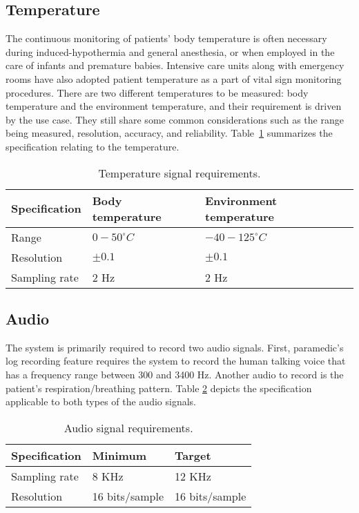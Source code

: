 \subsection{Temperature}

The continuous monitoring of patients' body temperature is often
necessary during induced-hypothermia and general anesthesia, or when
employed in the care of infants and premature babies. Intensive care
units along with emergency rooms have also adopted patient
temperature as a part of vital sign monitoring procedures. There are
two different temperatures to be measured: body temperature and the
environment temperature, and their requirement is driven by the use
case. They still share some common considerations such as the range
being measured, resolution, accuracy, and reliability.
Table~\ref{table:tmp} summarizes the specification relating to the
temperature. 

\begin{table}
	\caption{Temperature signal requirements.}
	\label{table:tmp}
	\centering
	\begin{tabular}{|l|l|l|}
		\hline
		Specification & Body temperature & Environment temperature \\
		\hline
		Range & $0-50 ^{\circ}C$ & $-40-125 ^{\circ}C$ \\
		Resolution & $\pm 0.1$ & $\pm 0.1$\\
		Sampling rate & 2 Hz & 2 Hz \\
		\hline
	\end{tabular}
\end{table}

\subsection{Audio}

The system is primarily required to record two audio signals. First,
paramedic's log recording feature requires the system to record the
human talking voice that has a frequency range between 300 and 3400
Hz.  Another audio to record is the patient's respiration/breathing
pattern. Table \ref{table:aud} depicts the specification applicable
to both types of the audio signals. 

\begin{table}
	\caption{Audio signal requirements.}
	\label{table:aud}
	\centering
	\begin{tabular}{|l|l|l|}
		\hline
		Specification & Minimum & Target \\
		\hline
		Sampling rate &  8 KHz & 12 KHz \\
		Resolution & 16 bits/sample & 16 bits/sample \\
		\hline
	\end{tabular}
\end{table}

